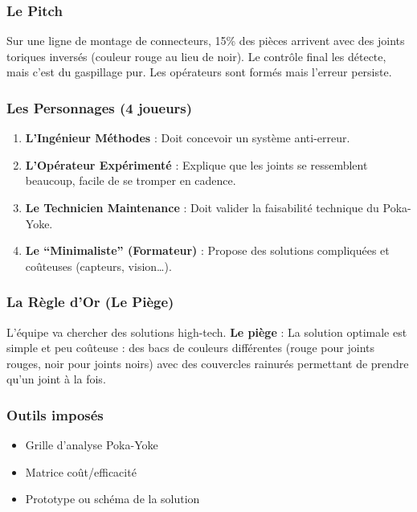 \documentclass[
]{article}
\providecommand{\tightlist}{%
  \setlength{\itemsep}{0pt}\setlength{\parskip}{0pt}}
\begin{document}
\subsubsection{Le Pitch}\label{le-pitch-4}

Sur une ligne de montage de connecteurs, 15\% des pièces arrivent avec
des joints toriques inversés (couleur rouge au lieu de noir). Le
contrôle final les détecte, mais c'est du gaspillage pur. Les opérateurs
sont formés mais l'erreur persiste.

\subsubsection{Les Personnages (4
joueurs)}\label{les-personnages-4-joueurs-3}

\begin{enumerate}
\def\labelenumi{\arabic{enumi}.}
\tightlist
\item
  \textbf{L'Ingénieur Méthodes} : Doit concevoir un système anti-erreur.
\item
  \textbf{L'Opérateur Expérimenté} : Explique que les joints se
  ressemblent beaucoup, facile de se tromper en cadence.
\item
  \textbf{Le Technicien Maintenance} : Doit valider la faisabilité
  technique du Poka-Yoke.
\item
  \textbf{Le ``Minimaliste'' (Formateur)} : Propose des solutions
  compliquées et coûteuses (capteurs, vision\ldots).
\end{enumerate}

\subsubsection{La Règle d'Or (Le
Piège)}\label{la-ruxe8gle-dor-le-piuxe8ge-4}

L'équipe va chercher des solutions high-tech. \textbf{Le piège} : La
solution optimale est simple et peu coûteuse : des bacs de couleurs
différentes (rouge pour joints rouges, noir pour joints noirs) avec des
couvercles rainurés permettant de prendre qu'un joint à la fois.

\subsubsection{Outils imposés}\label{outils-imposuxe9s-4}

\begin{itemize}
\tightlist
\item
  Grille d'analyse Poka-Yoke
\item
  Matrice coût/efficacité
\item
  Prototype ou schéma de la solution
\end{itemize}
\end{document}
